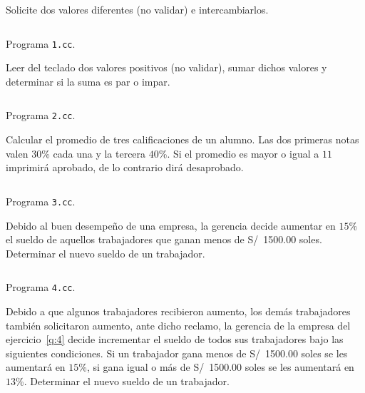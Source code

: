 \documentclass[spanish,addpoints,answers,a4paper]{exam}
\begin{document}
\begin{questions}

\question Solicite dos valores diferentes (no validar) e intercambiarlos.

\begin{solution}
	\begin{listing}[H]
		\footnotesize
		\inputminted{cpp}{1.cc}
		\caption{Programa \texttt{1.cc}.}
		\label{lst:2.1}
	\end{listing}
\end{solution}

\question Leer del teclado dos valores positivos (no validar), sumar dichos valores y determinar si la suma es par o impar.

\begin{solution}
	\begin{listing}[H]
		\footnotesize
		\inputminted{cpp}{2.cc}
		\caption{Programa \texttt{2.cc}.}
		\label{lst:2.2}
	\end{listing}
\end{solution}

\question Calcular el promedio de tres calificaciones de un alumno. Las dos primeras notas valen $30$\% cada una y la tercera $40$\%. Si el promedio es mayor o igual a $11$ imprimirá aprobado, de lo contrario dirá desaprobado.

\begin{solution}
	\begin{listing}[H]
		\footnotesize
		\inputminted{cpp}{3.cc}
		\caption{Programa \texttt{3.cc}.}
		\label{lst:1.3}
	\end{listing}
\end{solution}

\question Debido al buen desempeño de una empresa, la gerencia decide aumentar en $15$\% el sueldo de aquellos trabajadores que ganan menos de \SI{1500.00}[S/]{} soles. Determinar el nuevo sueldo de un trabajador.\label{q:4}

\begin{solution}
	\begin{listing}[H]
		\footnotesize
		\inputminted{cpp}{4.cc}
		\caption{Programa \texttt{4.cc}.}
		\label{lst:1.4}
	\end{listing}
\end{solution}

\question Debido a que algunos trabajadores recibieron aumento, los demás trabajadores también solicitaron aumento, ante dicho reclamo, la gerencia de la empresa del ejercicio~\ref{q:4} decide incrementar el sueldo de todos sus trabajadores bajo las siguientes condiciones. Si un trabajador gana menos de \SI{1500.00}[S/]{} soles se les aumentará en $15$\%, si gana igual o más de \SI{1500.00}[S/]{} soles se les aumentará en $13$\%. Determinar el nuevo sueldo de un trabajador.\label{q:5}


\end{questions}
\end{document}
